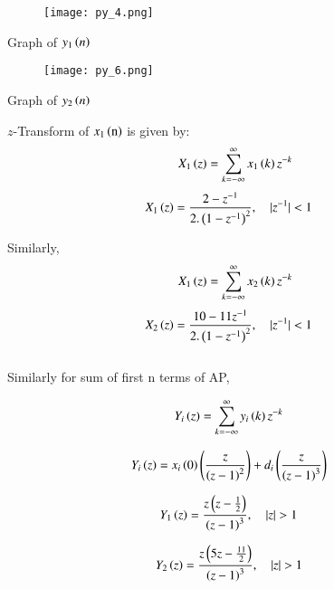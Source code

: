\documentclass[beamer]{IEEEtran}
\theoremstyle{remark}
\begin{document}
\begin{figure}[h]
    \centering
    \texttt{[image: py\_4.png]}
    \label{fig:s1n}
\end{figure}
\begin{center}
    Graph of $y_1\left(n\right)$\\[3ex]
\end{center}
\begin{figure}[h]
    \centering
    \texttt{[image: py\_6.png]}
    \label{s2n}
\end{figure}
\begin{center}
Graph of $y_2\left(n\right)$\\[5ex]
\end{center}

$z$-Transform of $x_1\left(\text{n}\right)$ is given by:\\
\begin{align}
X_1\left(z\right)&=\sum_{k=-\infty}^{\infty} x_1\left(k\right)z^{-k}\\
\end{align}
\begin{align} X_1\left(z\right)&=\frac{2-z^{-1}}{2.\left(1-z^{-1}\right)^2},\quad |z^{-1}|<1
\end{align}

Similarly,
\begin{align}
X_1\left(z\right)&=\sum_{k=-\infty}^{\infty} x_2\left(k\right)z^{-k}\\
\end{align}
\begin{align}X_2\left(z\right)&=\frac{10-11z^{-1}}{2.\left(1-z^{-1}\right)^2},\quad |z^{-1}|<1 \end{align}\\[1ex]

Similarly for sum of first n terms of AP,

\begin{align}
Y_i\left(z\right)&=\sum_{k=-\infty}^{\infty} y_i\left(k\right)z^{-k}
\end{align}

\begin{align}
\label{w1}
Y_i\left(z\right)&=x_i\left(0\right)\left(\frac{z}{\left(z-1\right)^2}\right)+d_i\left(\frac{z}{\left(z-1\right)^3}\right)
\end{align}

\begin{align}
Y_1\brak{z}&=\frac{z\brak{z-\frac{1}{2}}}{\brak{z-1}^3},\quad |z|>1
\end{align}

\begin{align}Y_2\brak{z}&=\frac{z\brak{5z-\frac{11}{2}}}{\brak{z-1}^3},\quad |z|>1\end{align}\\
\end{document}
